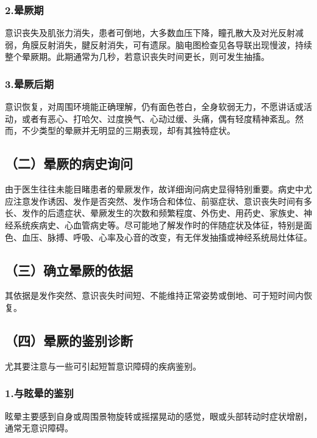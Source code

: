 \subsubsection{2.晕厥期}

意识丧失及肌张力消失，患者可倒地，大多数血压下降，瞳孔散大及对光反射减弱，角膜反射消失，腱反射消失，可有遗尿。脑电图检查见各导联出现慢波，持续整个晕厥期。此期通常为几秒，若意识丧失时间更长，则可发生抽搐。

\subsubsection{3.晕厥后期}

意识恢复，对周围环境能正确理解，仍有面色苍白，全身软弱无力，不愿讲话或活动，或者有恶心、打哈欠、过度换气、心动过缓、头痛，偶有轻度精神紊乱。然而，不少类型的晕厥并无明显的三期表现，却有其独特症状。

\subsection{（二）晕厥的病史询问}

由于医生往往未能目睹患者的晕厥发作，故详细询问病史显得特别重要。病史中尤应注意发作诱因、发作是否突然、发作场合和体位、前驱症状、意识丧失时间有多长、发作的后遗症状、晕厥发生的次数和频繁程度、外伤史、用药史、家族史、神经系统疾病史、心血管病史等。尽可能地了解发作时的伴随症状及体征，特别是面色、血压、脉搏、呼吸、心率及心音的改变，有无伴发抽搐或神经系统局灶体征。

\subsection{（三）确立晕厥的依据}

其依据是发作突然、意识丧失时间短、不能维持正常姿势或倒地、可于短时间内恢复。

\subsection{（四）晕厥的鉴别诊断}

尤其要注意与一些可引起短暂意识障碍的疾病鉴别。

\subsubsection{1.与眩晕的鉴别}

眩晕主要感到自身或周围景物旋转或摇摆晃动的感觉，眼或头部转动时症状增剧，通常无意识障碍。

